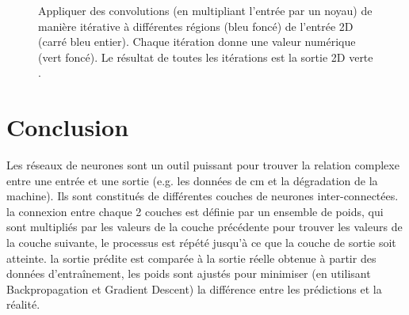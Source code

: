 \begin{figure}[H]
\begin{subfigure}{0.22\linewidth}
    \end{subfigure}
    \caption{Appliquer des convolutions (en multipliant l'entrée par un noyau) de manière itérative à différentes régions (bleu foncé) de l'entrée 2D (carré bleu entier). Chaque itération donne une valeur numérique (vert foncé). Le résultat de toutes les itérations est la sortie 2D verte \cite{dumoulin2016guide}.}
    \label{fig:convolutions}
\end{figure}


\section{Conclusion}
Les réseaux de neurones sont un outil puissant pour trouver la relation complexe entre une entrée et une sortie (e.g. les données de \acrlong{cm} et la dégradation de la machine). Ils sont constitués de différentes couches de neurones inter-connectées. la connexion entre chaque 2 couches est définie par un ensemble de poids, qui sont multipliés par les valeurs de la couche précédente pour trouver les valeurs de la couche suivante, le processus est répété jusqu'à ce que la couche de sortie soit atteinte. la sortie prédite est comparée à la sortie réelle obtenue à partir des données d'entraînement, les poids sont ajustés pour minimiser (en utilisant Backpropagation et Gradient Descent) la différence entre les prédictions et la réalité.
